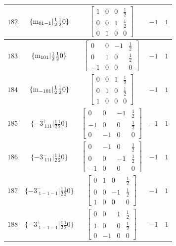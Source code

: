 \documentclass[fleqn,8pt]{jsarticle}
\begin{document}
\begin{longtable}{ccccc}
$ 182 $ & $ \{{\rm m}_{01-1}|\frac{1}{2} \frac{1}{2} 0\} $ & $ \begin{bmatrix} 1 & 0 & 0 & \frac{1}{2} \\ 0 & 0 & 1 & \frac{1}{2} \\ 0 & 1 & 0 & 0 \end{bmatrix} $ & $ -1 $ & $ 1 $ \\ \hline
$ 183 $ & $ \{{\rm m}_{101}|\frac{1}{2} \frac{1}{2} 0\} $ & $ \begin{bmatrix} 0 & 0 & -1 & \frac{1}{2} \\ 0 & 1 & 0 & \frac{1}{2} \\ -1 & 0 & 0 & 0 \end{bmatrix} $ & $ -1 $ & $ 1 $ \\ \hline
$ 184 $ & $ \{{\rm m}_{-101}|\frac{1}{2} \frac{1}{2} 0\} $ & $ \begin{bmatrix} 0 & 0 & 1 & \frac{1}{2} \\ 0 & 1 & 0 & \frac{1}{2} \\ 1 & 0 & 0 & 0 \end{bmatrix} $ & $ -1 $ & $ 1 $ \\ \hline
$ 185 $ & $ \{-3^{+}_{\,\,111}|\frac{1}{2} \frac{1}{2} 0\} $ & $ \begin{bmatrix} 0 & 0 & -1 & \frac{1}{2} \\ -1 & 0 & 0 & \frac{1}{2} \\ 0 & -1 & 0 & 0 \end{bmatrix} $ & $ -1 $ & $ 1 $ \\ \hline
$ 186 $ & $ \{-3^{-}_{\,\,111}|\frac{1}{2} \frac{1}{2} 0\} $ & $ \begin{bmatrix} 0 & -1 & 0 & \frac{1}{2} \\ 0 & 0 & -1 & \frac{1}{2} \\ -1 & 0 & 0 & 0 \end{bmatrix} $ & $ -1 $ & $ 1 $ \\ \hline
$ 187 $ & $ \{-3^{-}_{\,\,1-1-1}|\frac{1}{2} \frac{1}{2} 0\} $ & $ \begin{bmatrix} 0 & 1 & 0 & \frac{1}{2} \\ 0 & 0 & -1 & \frac{1}{2} \\ 1 & 0 & 0 & 0 \end{bmatrix} $ & $ -1 $ & $ 1 $ \\ \hline
$ 188 $ & $ \{-3^{+}_{\,\,1-1-1}|\frac{1}{2} \frac{1}{2} 0\} $ & $ \begin{bmatrix} 0 & 0 & 1 & \frac{1}{2} \\ 1 & 0 & 0 & \frac{1}{2} \\ 0 & -1 & 0 & 0 \end{bmatrix} $ & $ -1 $ & $ 1 $ \\ \hline

\end{longtable}
\end{document}
